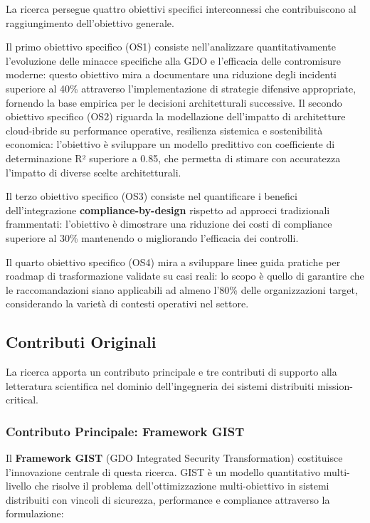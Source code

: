 \documentclass[12pt,a4paper,oneside]{book}
\numberwithin{figure}{chapter} %
\numberwithin{table}{chapter}  %
\begin{document}
La ricerca persegue quattro obiettivi specifici interconnessi che
contribuiscono al raggiungimento dell'obiettivo generale.

Il primo obiettivo specifico (OS1) consiste nell'analizzare
quantitativamente l'evoluzione delle minacce specifiche alla GDO e
l'efficacia delle contromisure moderne: questo obiettivo mira a
documentare una riduzione degli incidenti superiore al 40\% attraverso l'implementazione di strategie difensive appropriate, fornendo la base empirica per le decisioni architetturali successive.
Il secondo obiettivo specifico (OS2) riguarda la modellazione
dell'impatto di architetture cloud-ibride su performance operative, resilienza sistemica e sostenibilità economica: l'obiettivo è sviluppare un modello predittivo con coefficiente di determinazione R² superiore a 0.85, che permetta di stimare con accuratezza l'impatto di diverse scelte architetturali.

Il terzo obiettivo specifico (OS3) consiste nel quantificare i benefici
dell'integrazione \textbf{compliance-by-design} rispetto ad approcci tradizionali frammentati: l'obiettivo è dimostrare una riduzione dei costi di compliance superiore al 30\% mantenendo o migliorando l'efficacia dei controlli.

Il quarto obiettivo specifico (OS4) mira a sviluppare linee guida
pratiche per roadmap di trasformazione validate su casi reali: lo scopo è quello di garantire che le raccomandazioni siano applicabili ad almeno l'80\% delle organizzazioni target, considerando la varietà di contesti operativi nel settore.


\subsection{\texorpdfstring{\textbf{Contributi Originali}}{1.3.3 Contributi Originali}}\label{contributi-originali}

La ricerca apporta un contributo principale e tre contributi di supporto alla letteratura scientifica nel dominio dell'ingegneria dei sistemi distribuiti mission-critical.

\subsubsection{\texorpdfstring{\textbf{Contributo Principale: Framework GIST}}{1.3.3.1 Contributo Principale: Framework GIST}}\label{contributi-principale}

Il \textbf{Framework GIST} (GDO Integrated Security Transformation) costituisce l'innovazione centrale di questa ricerca. GIST è un modello quantitativo multi-livello che risolve il problema dell'ottimizzazione multi-obiettivo in sistemi distribuiti con vincoli di sicurezza, performance e compliance attraverso la formulazione:
\end{document}
